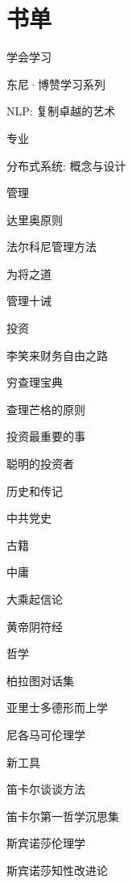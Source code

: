 \section{书单}

学会学习
\begin{enumbox} 
\item 东尼·博赞学习系列
\item NLP: 复制卓越的艺术
\end{enumbox} 

专业
\begin{enumbox} 
\item 分布式系统: 概念与设计
\end{enumbox} 

管理
\begin{enumbox} 
\item 达里奥原则
\item 法尔科尼管理方法
\item 为将之道
\item 管理十诫
\end{enumbox} 

投资
\begin{enumbox} 
\item 李笑来财务自由之路
\item 穷查理宝典
\item 查理芒格的原则
\item 投资最重要的事
\item 聪明的投资者
\end{enumbox} 

历史和传记
\begin{enumbox} 
\item 中共党史
\end{enumbox} 

古籍
\begin{enumbox} 
\item 中庸
\item 大乘起信论
\item 黄帝阴符经
\end{enumbox} 

哲学
\begin{enumbox} 
\item 柏拉图对话集
\item 亚里士多德形而上学
\item 尼各马可伦理学
\item 新工具
\item 笛卡尔谈谈方法
\item 笛卡尔第一哲学沉思集
\item 斯宾诺莎伦理学
\item 斯宾诺莎知性改进论
\end{enumbox} 
